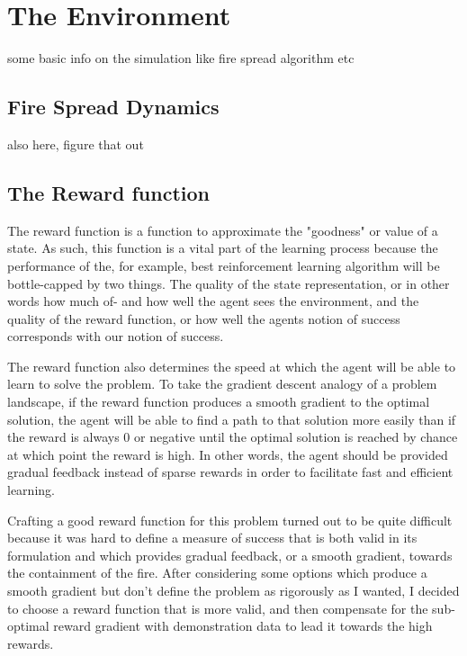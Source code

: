 \section{The Environment}\label{sec:environment}
some basic info on the simulation like fire spread algorithm etc

\subsection{Fire Spread Dynamics}\label{sec:fire_spread}
also here, figure that out

\subsection{The Reward function}\label{sec:reward_function}
The reward function is a function to approximate the "goodness" or value of a state. As such, this function is a vital part of the learning process because the performance of the, for example, best reinforcement learning algorithm will be bottle-capped by two things. The quality of the state representation, or in other words how much of- and how well the agent sees the environment, and the quality of the reward function, or how well the agents notion of success corresponds with our notion of success. 

The reward function also determines the speed at which the agent will be able to learn to solve the problem. To take the gradient descent analogy of a problem landscape, if the reward function produces a smooth gradient to the optimal solution, the agent will be able to find a path to that solution more easily than if the reward is always 0 or negative until the optimal solution is reached by chance at which point the reward is high. In other words, the agent should be provided gradual feedback instead of sparse rewards in order to facilitate fast and efficient learning.

Crafting a good reward function for this problem turned out to be quite difficult because it was hard to define a measure of success that is both valid in its formulation and which provides gradual feedback, or a smooth gradient, towards the containment of the fire. After considering some options which produce a smooth gradient but don't define the problem as rigorously as I wanted, I decided to choose a reward function that is more valid, and then compensate for the sub-optimal reward gradient with demonstration data to lead it towards the high rewards.

